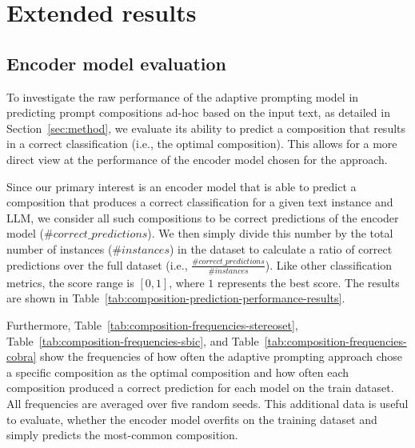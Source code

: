 \section{Extended results}
\label{sec:appendix-extended-results}



\subsection{Encoder model evaluation}

To investigate the raw performance of the adaptive prompting model in predicting prompt compositions ad-hoc based on the input text, as detailed in Section~\ref{sec:method}, we evaluate its ability to predict a composition that results in a correct classification (i.e., the optimal composition). This allows for a more direct view at the performance of the encoder model chosen for the approach.

Since our primary interest is an encoder model that is able to predict a composition that produces a correct classification for a given text instance and LLM, we consider all such compositions to be correct predictions of the encoder model ($\#correct\_predictions$). We then simply divide this number by the total number of instances ($\#instances$) in the dataset to calculate a ratio of correct predictions over the full dataset (i.e., $\frac{\#correct\_predictions}{\#instances}$). Like other classification metrics, the score range is $[0,1]$, where $1$ represents the best score. The results are shown in Table~\ref{tab:composition-prediction-performance-results}.

Furthermore, Table~\ref{tab:composition-frequencies-stereoset}, Table~\ref{tab:composition-frequencies-sbic}, and Table~\ref{tab:composition-frequencies-cobra} show the frequencies of how often the adaptive prompting approach chose a specific composition as the optimal composition and how often each composition produced a correct prediction for each model on the train dataset. All frequencies are averaged over five random seeds. This additional data is useful to evaluate, whether the encoder model overfits on the training dataset and simply predicts the most-common composition.







